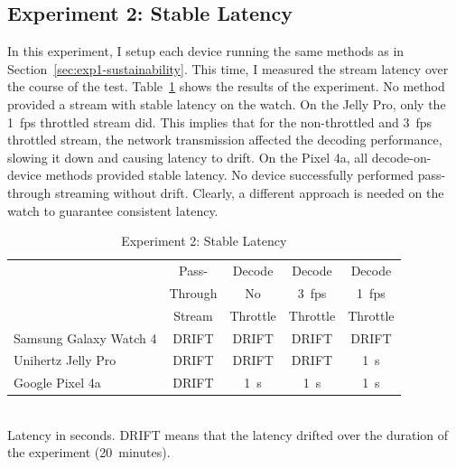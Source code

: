 \subsection{Experiment 2: Stable Latency}
In this experiment, I setup each device running the same methods as in Section~\ref{sec:exp1-sustainability}. This time, I measured the stream latency over the course of the test. Table~\ref{tab:stable-latency} shows the results of the experiment. No method provided a stream with stable latency on the watch. On the Jelly Pro, only the 1~fps throttled stream did. This implies that for the non-throttled and 3~fps throttled stream, the network transmission affected the decoding performance, slowing it down and causing latency to drift. On the Pixel 4a, all decode-on-device methods provided stable latency. No device successfully performed pass-through streaming without drift. Clearly, a different approach is needed on the watch to guarantee consistent latency.

\begin{table}
\centering
\begin{tabular}{|l|c|c|c|c|}
\hline
    & Pass- & Decode & Decode & Decode \\
    & Through & No & 3~fps & 1~fps \\
    & Stream & Throttle & Throttle & Throttle \\
\hline
Samsung Galaxy Watch 4 & \cellcolor{red!20}DRIFT & \cellcolor{red!20}DRIFT & \cellcolor{red!20}DRIFT & \cellcolor{red!20}DRIFT \\[0.1cm]
\hline
Unihertz Jelly Pro & \cellcolor{red!20}DRIFT & \cellcolor{red!20}DRIFT & \cellcolor{red!20}DRIFT & \cellcolor{green!20}1~s  \\[0.1cm]
\hline
Google Pixel 4a & \cellcolor{red!20}DRIFT & \cellcolor{green!20}1~s & \cellcolor{green!20}1~s & \cellcolor{green!20}1~s \\[0.1cm]
\hline
\end{tabular}
    \begin{captext}
    \\[0.1cm] \small Latency in seconds. DRIFT means that the latency drifted over the duration of the experiment (20~minutes).
    \end{captext}
\caption{Experiment 2: Stable Latency}
\label{tab:stable-latency}
\end{table}

